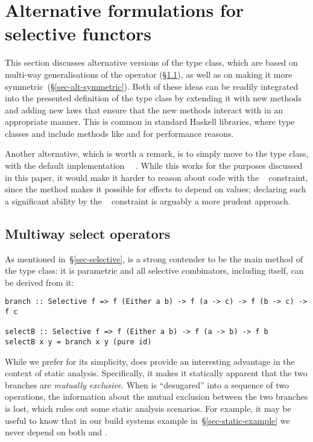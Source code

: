\section{Alternative formulations for selective functors}
\label{sec-alternatives}

This section discusses alternative versions of the  type class,
which are based on multi-way generalisations of the  operator
(\S\ref{sec-alt-multi}), as well as on making it more
symmetric~(\S\ref{sec-alt-symmetric}). Both of these ideas can be readily
integrated into the presented definition of the  type class by
extending it with new methods and adding new laws that ensure that the
new methods interact with  in an appropriate manner. This is common
in standard Haskell libraries, where type classes  and
 include methods like \hs{*>} and \hs{>>} for performance reasons.

Another alternative, which is worth a remark, is to simply move 
to the  type class, with the default implementation
~\hs{=}~. While this works for the purposes discussed in
this paper, it would make it harder to reason about code with the
~ constraint, since the  method makes it
possible for effects to depend on values; declaring such a significant ability
by the ~ constraint is arguably a more prudent approach.

\subsection{Multiway select operators}\label{sec-alt-multi}

As mentioned in~\S\ref{sec-selective},  is a strong contender to be
the main method of the  type class: it is parametric and all
selective combinators, including  itself, can be derived from it:

\vspace{1mm}
\begin{verbatim}
branch :: Selective f => f (Either a b) -> f (a -> c) -> f (b -> c) -> f c

selectB :: Selective f => f (Either a b) -> f (a -> b) -> f b
selectB x y = branch x y (pure id)
\end{verbatim}
\vspace{1mm}

\noindent
While we prefer  for its simplicity,  does provide an
interesting advantage in the context of static analysis. Specifically, it makes
it statically apparent that the two branches are \emph{mutually exclusive}. When
 is ``desugared'' into a sequence of two  operations, the
information about the mutual exclusion between the two branches is lost, which
rules out some static analysis scenarios. For example, it may be useful to know
that in our build systems example in~\S\ref{sec-static-example} we never depend
on both  and .

